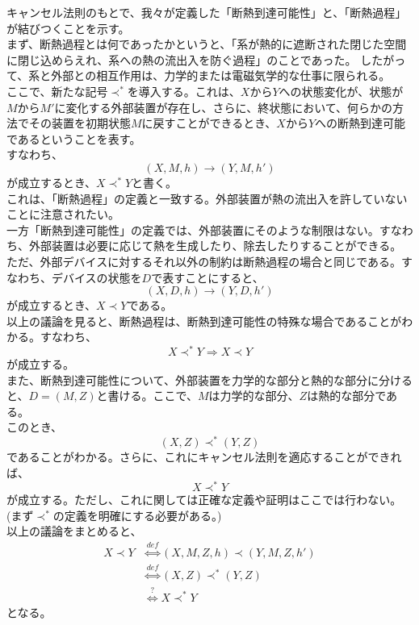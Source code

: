 \documentclass[a4paper,11pt]{jsarticle}
\numberwithin{equation}{section}
\begin{document}
キャンセル法則のもとで、我々が定義した「断熱到達可能性」と、「断熱過程」が結びつくことを示す。\\
まず、断熱過程とは何であったかというと、「系が熱的に遮断された閉じた空間に閉じ込めらえれ、系への熱の流出入を防ぐ過程」のことであった。
したがって、系と外部との相互作用は、力学的または電磁気学的な仕事に限られる。\\
ここで、新たな記号$\prec ^*$を導入する。これは、$X$から$Y$への状態変化が、状態が$M$から$M'$に変化する外部装置が存在し、さらに、終状態において、何らかの方法でその装置を初期状態$M$に戻すことができるとき、$X$から$Y$への断熱到達可能であるということを表す。\\
すなわち、
\begin{equation}
    (X,M,h) \rightarrow (Y,M,h')
\end{equation}
が成立するとき、$X \prec ^* Y$と書く。\\
これは、「断熱過程」の定義と一致する。外部装置が熱の流出入を許していないことに注意されたい。\\

一方「断熱到達可能性」の定義では、外部装置にそのような制限はない。すなわち、外部装置は必要に応じて熱を生成したり、除去したりすることができる。\\
ただ、外部デバイスに対するそれ以外の制約は断熱過程の場合と同じである。すなわち、デバイスの状態を$D$で表すことにすると、
\begin{equation}
    (X,D,h) \rightarrow (Y,D,h')
\end{equation}
が成立するとき、$X \prec Y$である。\\

以上の議論を見ると、断熱過程は、断熱到達可能性の特殊な場合であることがわかる。すなわち、
\begin{equation}
    X \prec ^* Y \Rightarrow X \prec Y
\end{equation}
が成立する。\\
また、断熱到達可能性について、外部装置を力学的な部分と熱的な部分に分けると、$D = (M,Z)$と書ける。ここで、$M$は力学的な部分、$Z$は熱的な部分である。\\
このとき、
\begin{equation}
    (X,Z) \prec^* (Y,Z)
\end{equation}
であることがわかる。さらに、これにキャンセル法則を適応することができれば、
\begin{equation}
    X \prec^* Y
\end{equation}
が成立する。ただし、これに関しては正確な定義や証明はここでは行わない。(まず$\prec^*$の定義を明確にする必要がある。)\\
以上の議論をまとめると、
\begin{align}
    X \prec Y & \overset{def}{\Leftrightarrow} (X,M,Z,h) \prec (Y,M,Z,h')\\
    &\overset{def}{\Leftrightarrow} (X,Z) \prec^* (Y,Z)\\
    &\overset{?}{\Leftrightarrow} X \prec^* Y
\end{align}
となる。\\
\end{document}

